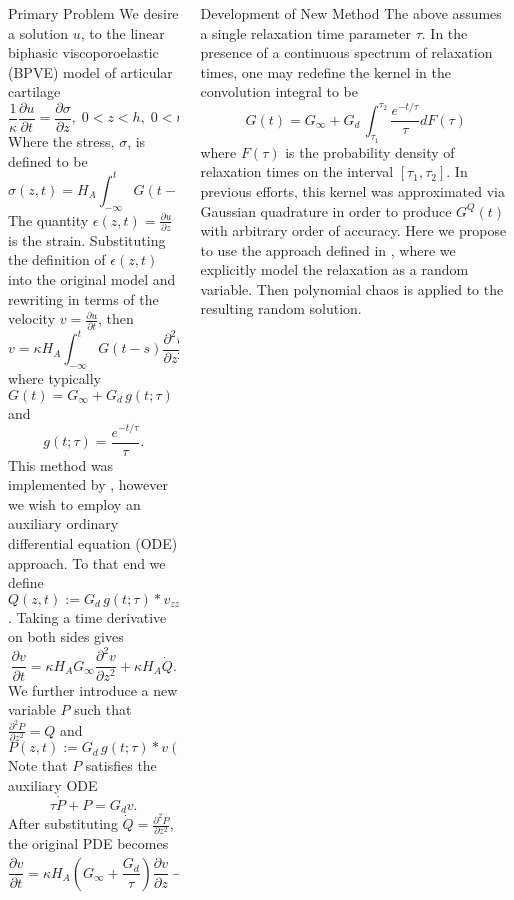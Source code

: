 \documentclass[final]{beamer} %
\newcommand{\pd}[2]{\frac{\partial#1}{\partial#2}}
\begin{document}
\begin{frame}[t]
\begin{columns}[t]
\begin{column}{0.28\paperwidth}
\begin{block}{Primary Problem}
We desire a solution $u$, to the linear biphasic viscoporoelastic (BPVE) model
of articular cartilage
\[
\frac{1}{\kappa} \pd{u}{t} = \pd{\sigma}{z},\; 0<z<h,\; 0<t<t_f.
\]
Where the stress, $\sigma$, is defined to be
\[
\sigma(z,t) = H_A \int_{-\infty}^{t} G(t-s)  \pd{\epsilon}{s} ds.
\]
The quantity $\epsilon(z,t) = \pd{u}{z}$ is the strain. Substituting
the definition of 
$\epsilon(z,t)$ into the original model and rewriting in terms of the
velocity $v=\pd{u}{t}$, then
\[
 v = \kappa H_A \int_{-\infty}^{t}G(t-s) \pd{^2 v}{z^2} (z, s) ds.
\]
where typically $G(t) = G_{\infty} + G_d \, g(t;\tau)$ and 
\[
g(t;\tau)=\frac{e^{-t/\tau}}{\tau}.
\]
This method was implemented by \cite{stuebner,schugart}, however we
wish to employ an auxiliary ordinary differential equation (ODE)
approach. To that end we define $Q(z,t) := G_d \, g(t; \tau) *
v_{zz}$. Taking a time derivative on both sides gives
\[
\pd{v}{t} = \kappa H_A G_{\infty} \pd{^2 v}{z^2} + \kappa H_A \dot{Q}.
\]
We further introduce a new variable $P$ such that $\pd{^2 P}{z^2} = Q$ and
\[
P(z, t) := G_d \, g(t; \tau) * v(z,t).
\]
Note that $P$ satisfies the auxiliary ODE
\[
\tau\dot{P} +P = G_d v.
\]
After substituting $\dot{Q}=\pd{^2 \dot{P}}{z^2}$, the original PDE becomes
\[
\pd{v}{t} = \kappa H_A \left(G_{\infty} + \frac{G_d}{\tau}\right) \pd{v}{z} - 
\frac{\kappa H_A}{\tau} \pd{^2 P}{z^2}
\]
\end{block}

\end{column}
\begin{column}{0.28\paperwidth}

\begin{alertblock}{Development of New Method}
The above assumes a single relaxation time parameter $\tau$. In the
presence of a continuous spectrum of relaxation times, one may redefine the kernel in
the convolution integral to be
\[
G(t) = G_{\infty} + G_d \, \int_{\tau_1}^{\tau_2} \frac{e^{-t/\tau}}{\tau} dF(\tau)
\]
where $F(\tau)$ is the probability density of relaxation times on the interval $[\tau_1,
\tau_2]$. In previous efforts, this kernel was approximated via Gaussian quadrature
in order to produce $G^Q (t)$ with arbitrary order of accuracy. Here we propose to use
the approach defined in \cite{gibson}, where we explicitly model the relaxation as a
random variable. Then polynomial chaos is applied to the resulting random solution.
\end{alertblock}


\end{column}
\end{columns}
\end{frame}
\end{document}
